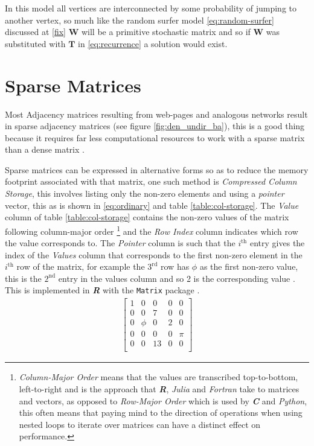 \documentclass[11pt]{report}
\begin{document}
In this model all vertices are interconnected by some probability of jumping to
another vertex, so much like the random surfer model \eqref{eq:random-surfer} discussed
at \ref{fix} \(\mathbf{W}\) will be a primitive stochastic matrix and so if
\(\mathbf{W}\) was substituted with \(\mathbf{T}\) in \eqref{eq:recurrence} a solution
would exist.

\section{Sparse Matrices}
\label{sparse-matrix}
Most Adjacency matrices resulting from web-pages and analogous networks
result in sparse adjacency matrices (see figure \ref{fig:den_undir_ba}),
this is a good thing because it requires far less computational
resources to work with a sparse matrix than a dense matrix
 \cite[]{langvilleGooglePageRankScience2012} .



Sparse matrices can be expressed in alternative forms so as to reduce the memory
footprint associated with that matrix, one such method is \emph{Compressed Column
Storage}, this involves listing only the non-zero elements and using a \textit{pointer} vector, this as is shown in \eqref{eq:ordinary}
and table \ref{table:col-storage}. The \textit{Value} column of table \ref{table:col-storage} contains the non-zero values of the matrix following column-major order \footnote{\textit{Column-Major Order} means that the values are transcribed top-to-bottom, left-to-right and is the approach that \textit{\textbf{R}}, \textit{Julia} and \textit{Fortran} take to matrices and vectors, as opposed to \textit{Row-Major Order} which is used by \textbf{\textit{C}} and \textit{Python}, this often means that paying mind to the direction of operations when using nested loops to iterate over matrices can have a distinct effect on performance.} and the \textit{Row Index} column indicates which row the value corresponds to. The \textit{Pointer} column is such that the  \(i^{\mathrm{th}}\) entry gives the index of the \textit{Values} column that corresponds to the first non-zero element in the \(i^{\mathrm{th}}\) row of the matrix, for example the \(3^{\mathrm{rd}}\) row has \(\phi\) as the first non-zero value, this is the \(2^{\mathrm{nd}}\) entry in the values column and so 2 is the corresponding value \cite{IntelMathKernel}. This is implemented in \textbf{\emph{R}} with the \texttt{Matrix} package \cite{douglasbatesMatrixSparseDense2019}.
\begin{align}
    \begin{bmatrix}
	1 & 0 & 0 & 0 & 0 \\
	0 & 0 & 7 & 0 & 0 \\
	0 & \phi & 0 & 2 & 0 \\
	0 & 0 & 0 & 0 & \pi \\
	0 & 0 & 13 & 0 & 0 \\
    \end{bmatrix}  \label{eq:ordinary}
\end{align}
\end{document}
